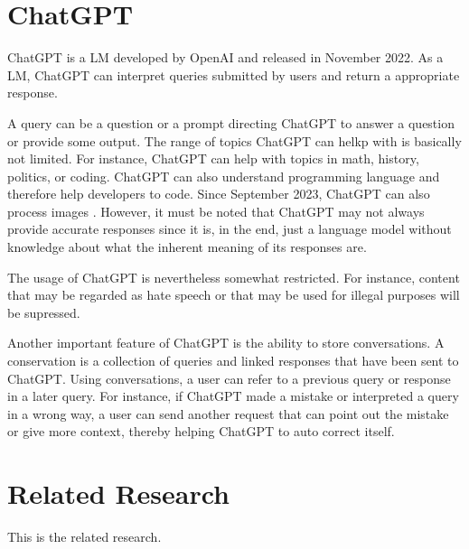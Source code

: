 \section{ChatGPT}

ChatGPT \cite{ChatGPT_url} is a \ac{LM} developed by OpenAI and released in November 2022. As a \ac{LM}, ChatGPT can interpret queries submitted by users and return a appropriate response. 

A query can be a question or a prompt directing ChatGPT to answer a question or provide some output. The range of topics ChatGPT can helkp with is basically not limited. For instance, ChatGPT can help with topics in math, history, politics, or coding. ChatGPT can also understand programming language and therefore help developers to code.  Since September 2023, ChatGPT can also process images \cite{ChatGPT_image}. However, it must be noted that ChatGPT may not always provide accurate responses since it is, in the end, just a language model without knowledge about what the inherent meaning of its responses are. 

The usage of ChatGPT is nevertheless somewhat restricted. For instance, content that may be regarded as hate speech or that may be used for illegal purposes will be supressed.

Another important feature of ChatGPT is the ability to store conversations. A conservation is a collection of queries and linked responses that have been sent to ChatGPT. Using conversations, a user can refer to a previous query or response in a later query. For instance, if ChatGPT made a mistake or interpreted a query in a wrong way, a user can send another request that can point out the mistake or give more context, thereby helping ChatGPT to auto correct itself. 


\section{Related Research}
This is the related research.